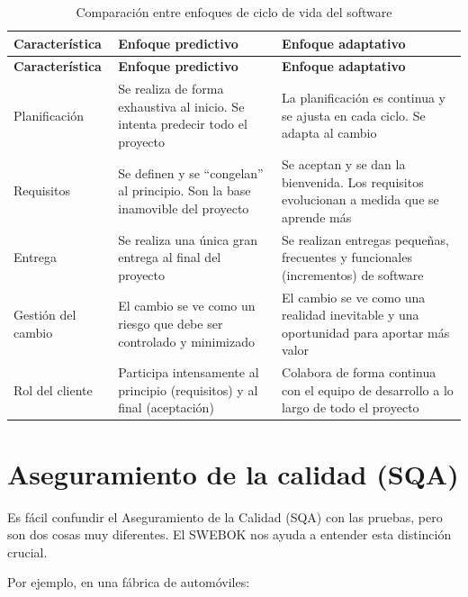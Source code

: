 \begin{longtable}{p{3cm} p{6cm} p{6cm}}
\caption{Comparación entre enfoques de ciclo de vida del software} \\
\toprule
\textbf{Característica} & \textbf{Enfoque predictivo} & \textbf{Enfoque adaptativo} \\
\midrule
\endfirsthead

\toprule
\textbf{Característica} & \textbf{Enfoque predictivo} & \textbf{Enfoque adaptativo} \\
\midrule
\endhead

\bottomrule
\endfoot

Planificación & Se realiza de forma exhaustiva al inicio. Se intenta predecir todo el proyecto & La planificación es continua y se ajusta en cada ciclo. Se adapta al cambio \\

Requisitos & Se definen y se ``congelan'' al principio. Son la base inamovible del proyecto & Se aceptan y se dan la bienvenida. Los requisitos evolucionan a medida que se aprende más \\

Entrega & Se realiza una única gran entrega al final del proyecto & Se realizan entregas pequeñas, frecuentes y funcionales (incrementos) de software \\

Gestión del cambio & El cambio se ve como un riesgo que debe ser controlado y minimizado & El cambio se ve como una realidad inevitable y una oportunidad para aportar más valor \\

Rol del cliente & Participa intensamente al principio (requisitos) y al final (aceptación) & Colabora de forma continua con el equipo de desarrollo a lo largo de todo el proyecto \\
\end{longtable}

\section{Aseguramiento de la calidad (SQA)}
Es fácil confundir el Aseguramiento de la Calidad (SQA) con las pruebas, pero son dos cosas muy diferentes. 
El SWEBOK nos ayuda a entender esta distinción crucial.

Por ejemplo, en una fábrica de automóviles:

